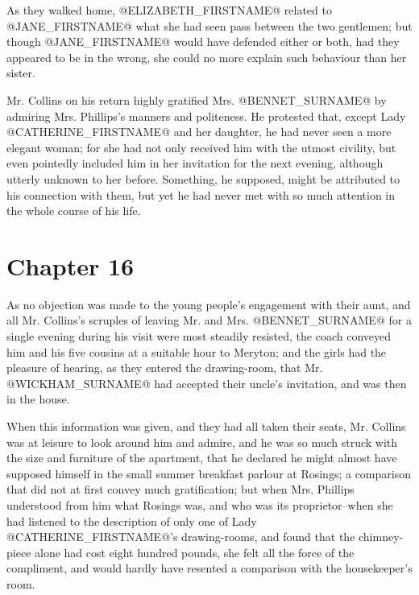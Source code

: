 As they walked home, @ELIZABETH_FIRSTNAME@ related to @JANE_FIRSTNAME@ what she had seen pass
between the two gentlemen; but though @JANE_FIRSTNAME@ would have defended either
or both, had they appeared to be in the wrong, she could no more explain
such behaviour than her sister.

Mr. Collins on his return highly gratified Mrs. @BENNET_SURNAME@ by admiring
Mrs. Phillips's manners and politeness. He protested that, except Lady
@CATHERINE_FIRSTNAME@ and her daughter, he had never seen a more elegant woman;
for she had not only received him with the utmost civility, but even
pointedly included him in her invitation for the next evening, although
utterly unknown to her before. Something, he supposed, might be
attributed to his connection with them, but yet he had never met with so
much attention in the whole course of his life.



\chapter*{Chapter 16}


As no objection was made to the young people's engagement with their
aunt, and all Mr. Collins's scruples of leaving Mr. and Mrs. @BENNET_SURNAME@ for
a single evening during his visit were most steadily resisted, the coach
conveyed him and his five cousins at a suitable hour to Meryton; and
the girls had the pleasure of hearing, as they entered the drawing-room,
that Mr. @WICKHAM_SURNAME@ had accepted their uncle's invitation, and was then in
the house.

When this information was given, and they had all taken their seats, Mr.
Collins was at leisure to look around him and admire, and he was so much
struck with the size and furniture of the apartment, that he declared he
might almost have supposed himself in the small summer breakfast
parlour at Rosings; a comparison that did not at first convey much
gratification; but when Mrs. Phillips understood from him what
Rosings was, and who was its proprietor--when she had listened to the
description of only one of Lady @CATHERINE_FIRSTNAME@'s drawing-rooms, and found
that the chimney-piece alone had cost eight hundred pounds, she felt all
the force of the compliment, and would hardly have resented a comparison
with the housekeeper's room.

